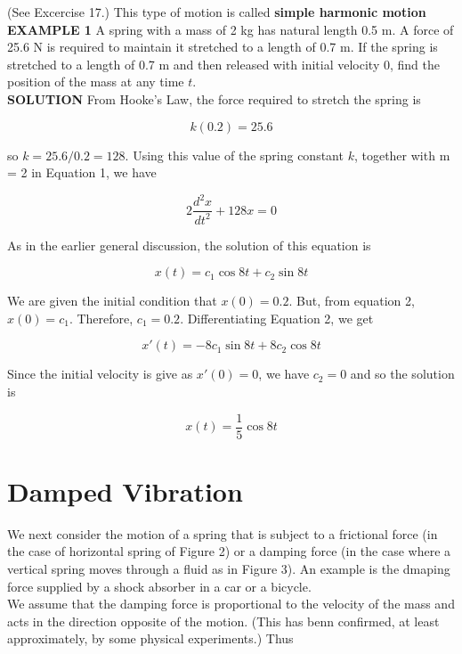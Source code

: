 \documentclass[12pt]{article}
\begin{document}
      (See Excercise 17.) This type of motion is called \textbf{simple harmonic motion} \\

      \textbf{EXAMPLE 1} A spring with a mass of 2 kg has natural length 0.5 m. A force of
      25.6 N is required to maintain it stretched to a length of 0.7 m. If the spring is
      stretched to a length of 0.7 m and then released with initial velocity 0, find the
      position of the mass at any time $t$. \\

      \textbf{SOLUTION} From Hooke's Law, the force required to stretch the spring is 

      \begin{equation*}
        k(0.2) = 25.6
      \end{equation*}

      so $k = 25.6/0.2 = 128$. Using this value of the spring constant $k$, together with m = 2 in Equation 1, we have 
      
      \begin{equation*}
        2\frac{d^2x}{dt^2} +128x = 0
      \end{equation*}

      As in the earlier general discussion, the solution of this equation is 
      
      \begin{equation}
        x(t) = c_1\cos8t + c_2\sin8t
      \end{equation}

      We are given the initial condition that $x(0) = 0.2$. But, from equation 2, $x(0) = c_1$.
      Therefore, $c_1 = 0.2$. Differentiating Equation 2, we get 
      
      \begin{equation*}
        x'(t) = -8c_1\sin8t + 8c_2\cos8t
      \end{equation*}

      Since the initial velocity is give as $x'(0) = 0$, we have $c_2 = 0$ and so the solution is 

      \begin{equation*}
        x(t) = \frac{1}{5}\cos8t
      \end{equation*}


      \section{Damped Vibration}
      We next consider the motion of a spring that is subject to a frictional force (in the case
          of horizontal spring of Figure 2) or a damping force (in the case where a vertical
            spring moves through a fluid as in Figure 3). An example is the dmaping force
          supplied by a shock absorber in a car or a bicycle. \\
      \quad We assume that the damping force is proportional to the velocity of the mass and acts
      in the direction opposite of the motion. (This has benn confirmed, at least
          approximately, by some physical experiments.) Thus 
\end{document}
